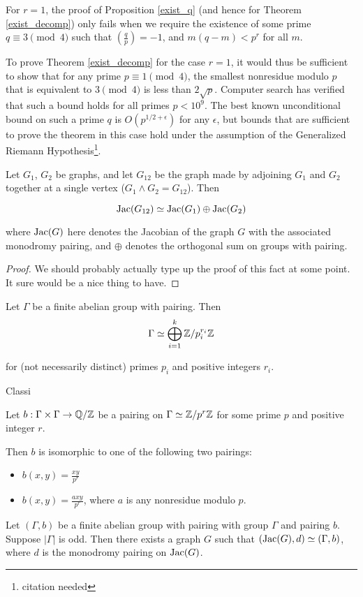 \documentclass{article}
\begin{document}
\begin{remark} For $r=1$, the proof of Proposition \ref{exist_q} (and
  hence for Theorem \ref{exist_decomp}) only fails when we require the
  existence of some prime $q \equiv 3 \pmod 4$ such that $\left(
    \frac{q}{p} \right) = -1$, and $m(q-m) < p^r$ for all $m$.

  To prove Theorem \ref{exist_decomp} for the case $r=1$, it would
  thus be sufficient to show that for any prime $p \equiv 1 \pmod 4$,
  the smallest nonresidue modulo $p$ that is equivalent to $3 \pmod 4$
  is less than $2\sqrt{p}$. Computer search has verified that such a
  bound holds for all primes $p < 10^9$. The best known unconditional
  bound on such a prime $q$ is $O(p^{1/2 + \epsilon})$ for any
  $\epsilon$, but bounds that are sufficient to prove the theorem in
  this case hold under the assumption of the Generalized Riemann
  Hypothesis\footnote{citation needed}.
\end{remark}

\begin{prop}
\label{wedge_product}
Let $G_1$, $G_2$ be graphs, and let $G_{12}$ be the graph made by
adjoining $G_1$ and $G_2$ together at a single vertex ($G_1 \wedge G_2
= G_{12}$). Then

  $$\operatorname{Jac}(G_{12}) \simeq \operatorname{Jac}(G_1) \oplus \operatorname{Jac}(G_2)$$

  where $\operatorname{Jac}(G)$ here denotes the Jacobian of the graph $G$ with the
  associated monodromy pairing, and $\oplus$ denotes the orthogonal sum
  on groups with pairing.
\end{prop}

\begin{proof} We should probably actually type up the proof of this
  fact at some point. It sure would be a nice thing to have.
\end{proof}

\begin{thm}
  Let $\Gamma$ be a finite abelian group with pairing. Then
  \begin{equation}
    \Gamma \simeq \bigoplus_{i=1}^k \mathbb{Z}/p_i^{r_i}\mathbb{Z}
  \end{equation}

  for (not necessarily distinct) primes $p_i$ and positive integers
  $r_i$. 
\end{thm}

Classi

\begin{thm}
  Let $b:\Gamma \times \Gamma \to \mathbb{Q}/\mathbb{Z}$ be a pairing on $\Gamma
  \simeq \mathbb{Z}/p^r\mathbb{Z}$ for some prime $p$ and positive integer $r$. 

  Then $b$ is isomorphic to one of the following two pairings:
  
  \begin{itemize}
    \item $b(x,y) = \frac{xy}{p^r}$
    \item $b(x,y) = \frac{axy}{p^r}$, where $a$ is any nonresidue
      modulo $p$.
  \end{itemize}
\end{thm}

\begin{thm}
  Let $(\Gamma, b)$ be a finite abelian group with pairing with group
  $\Gamma$ and pairing $b$. Suppose $|\Gamma|$ is odd. Then there
  exists a graph $G$ such that $(\operatorname{Jac}(G), d) \simeq (\Gamma, b)$,
  where $d$ is the monodromy pairing on $\operatorname{Jac}(G)$. 
\end{thm}
\end{document}
